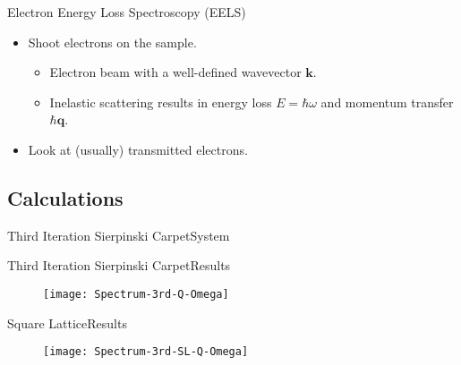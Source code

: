 \documentclass{beamer}
\begin{document}
\begin{frame}{Electron Energy Loss Spectroscopy (EELS)}
    \begin{itemize}
    \item<1-> Shoot electrons on the sample.
        \begin{itemize}
        \item<3-> Electron beam with a well-defined wavevector $\mathbf{k}$.
        \item<4-> Inelastic scattering results in \alert{energy loss $E = \hbar\omega$} and \alert{momentum transfer $\hbar\mathbf{q}$}.
        \end{itemize}
    \item<2-> Look at (usually) transmitted electrons.
    \end{itemize}
\end{frame}

\subsection{Calculations}

\begin{frame}{Third Iteration Sierpinski Carpet}{System}
    \begin{figure}
    \vspace{-.5cm}
    
    \end{figure}
\end{frame}

\begin{frame}{Third Iteration Sierpinski Carpet}{Results}
    \begin{figure}
    \texttt{[image: Spectrum-3rd-Q-Omega]}
    \end{figure}
\end{frame}

\begin{frame}{Square Lattice}{Results}
    \begin{figure}
    \texttt{[image: Spectrum-3rd-SL-Q-Omega]}
    \end{figure}
\end{frame}
\end{document}

